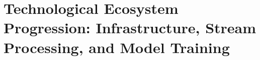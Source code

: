 \section{Technological Ecosystem Progression: Infrastructure, Stream Processing, and Model Training}
%
